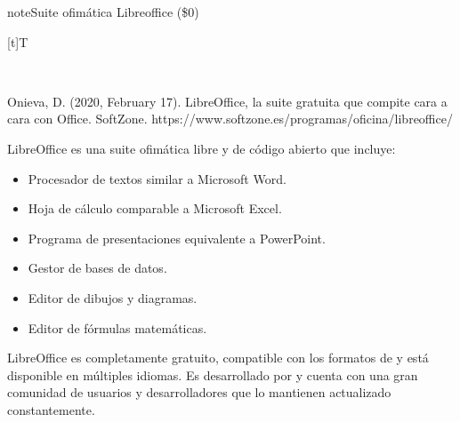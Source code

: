 \documentclass[letterpaper,10pt,spanish]{sphinxmanual}
\let\sphinxpxdimen\pdfpxdimen\else\newdimen\sphinxpxdimen
\begin{document}
\begin{sphinxadmonition}{note}{Suite ofimática Libreoffice (\$0)}


\begin{savenotes}\sphinxattablestart
\sphinxthistablewithglobalstyle
\centering
\begin{tabulary}{\linewidth}[t]{T}
\sphinxtoprule
\sphinxtableatstartofbodyhook

\begin{sphinxfigure-in-table}
\centering
\capstart
\noindent\sphinxincludegraphics[width=360\sphinxpxdimen]{{image083}.png}
\label{\detokenize{1_guias/10ofimatica/G1012:id48}}\end{sphinxfigure-in-table}\relax
\\
\sphinxbottomrule
\end{tabulary}
\sphinxtableafterendhook\par
\sphinxattableend\end{savenotes}

\sphinxAtStartPar
%
\begin{footnote}[10]\sphinxAtStartFootnote
Onieva, D. (2020, February 17). LibreOffice, la suite gratuita que compite cara a cara con Office. SoftZone. https://www.softzone.es/programas/oficina/libreoffice/
%
\end{footnote} LibreOffice es una suite ofimática libre y de código abierto que incluye:
\begin{itemize}
\item {} 
\sphinxAtStartPar
{} Procesador de textos similar a Microsoft Word.

\item {} 
\sphinxAtStartPar
{} Hoja de cálculo comparable a Microsoft Excel.

\item {} 
\sphinxAtStartPar
{} Programa de presentaciones equivalente a PowerPoint.

\item {} 
\sphinxAtStartPar
{} Gestor de bases de datos.

\item {} 
\sphinxAtStartPar
{} Editor de dibujos y diagramas.

\item {} 
\sphinxAtStartPar
{} Editor de fórmulas matemáticas.

\end{itemize}

\sphinxAtStartPar
LibreOffice es completamente gratuito, compatible con los formatos de  y está disponible en múltiples idiomas. Es desarrollado por  y cuenta con una gran comunidad de usuarios y desarrolladores que lo mantienen actualizado constantemente.
\end{sphinxadmonition}
\end{document}
